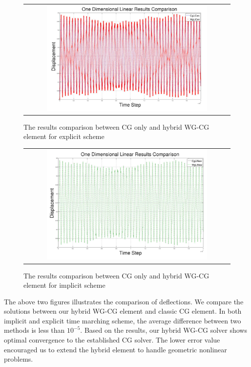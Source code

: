       	      \begin{figure}[H]
      	      	\centering
      	      	\begin{tabular}{c}
      	      		\includegraphics[width=0.8\textwidth]{./pics/result1d2.png}
      	      	\end{tabular}
      	      	\caption{\footnotesize The results comparison between CG only and hybrid WG-CG element for explicit scheme}
      	      \end{figure}
      	      
      	       \begin{figure}[H]
      	       	\centering
      	       	\begin{tabular}{c}
      	       		\includegraphics[width=0.8\textwidth]{./pics/result1d3.png}
      	       	\end{tabular}
      	       	\caption{\footnotesize The results comparison between CG only and hybrid WG-CG element for implicit scheme}
      	       \end{figure}
      	       
      	       The above two figures illustrates the comparison of deflections. We compare the solutions between our hybrid WG-CG element and classic CG element. In both implicit and explicit time marching scheme, the average difference between two methods is less than $ 10^{-5} $. Based on the results, our hybrid WG-CG solver shows optimal convergence to the established CG solver. The lower error value encouraged us to extend the hybrid element to handle geometric nonlinear problems.
      	       
